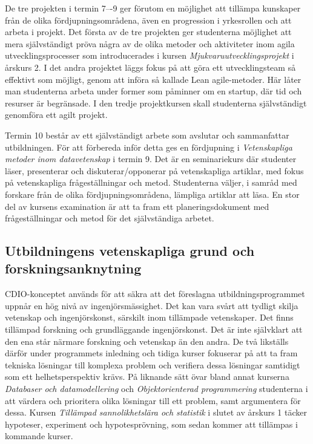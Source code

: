 De tre projekten i termin 7–-9 ger förutom en möjlighet att tillämpa kunskaper från de olika fördjupningsområdena, även en progression i yrkesrollen och att arbeta i projekt. Det första av de tre projekten ger studenterna möjlighet att mera självständigt pröva några av de olika metoder och aktiviteter inom agila utvecklingsprocesser som introducerades i kursen \emph{Mjukvaruutvecklingsprojekt} i årskurs 2. I det andra projektet läggs fokus på att göra ett utvecklingsteam så effektivt som möjligt, genom att införa så kallade Lean agile-metoder. Här låter man studenterna arbeta under former som påminner om en startup, där tid och resurser är begränsade. I den tredje projektkursen skall studenterna självständigt genomföra ett agilt projekt.

Termin 10 består av ett självständigt arbete som avslutar och sammanfattar utbildningen. För att förbereda inför detta ges en fördjupning i \emph{Vetenskapliga metoder inom datavetenskap} i termin 9. Det är en seminariekurs där studenter läser, presenterar och diskuterar/opponerar på vetenskapliga artiklar, med fokus på vetenskapliga frågeställningar och metod. Studenterna väljer, i samråd med forskare från de olika fördjupningsområdena, lämpliga artiklar att läsa. En stor del av kursens examination är att ta fram ett planeringsdokument med frågeställningar och metod för det självständiga arbetet.

\subsection{Utbildningens vetenskapliga grund och forskningsanknytning}

 CDIO-konceptet används för att säkra att det föreslagna utbildningsprogrammet uppnår en hög nivå av ingenjörsmässighet. Det kan vara svårt att tydligt skilja vetenskap och ingenjörskonst, särskilt inom tillämpade vetenskaper. Det finns tillämpad forskning och grundläggande ingenjörskonst. Det är inte självklart att den ena står närmare forskning och vetenskap än den andra. De två likställs därför under programmets inledning och tidiga kurser fokuserar på att ta fram tekniska lösningar till komplexa problem och verifiera dessa lösningar samtidigt som ett helhetsperspektiv krävs. På liknande sätt övar bland annat kurserna \emph{Databaser och datamodellering} och \emph{Objektorienterad programmering} studenterna i att värdera och prioritera olika lösningar till ett problem, samt argumentera för dessa. Kursen \emph{Tillämpad sannolikhetslära och statistik} i slutet av årskurs 1 täcker hypoteser, experiment och hypotesprövning, som sedan kommer att tillämpas i kommande kurser.

